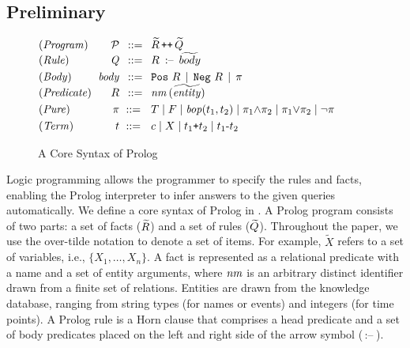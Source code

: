 \subsection{Preliminary}
\label{subsec3.1}

\begin{figure}[!b]
{
\vspace{-2mm}
\centering
\small
$
\arraycolsep=3pt\def\arraystretch{1}
\begin{array}{@{}lrcl}
\m{(Program)}&  \Prolog &{::=  } &
\widetilde{\relation} \,\plus\plus\,   \widetilde{\drule} 
\\
\m{(Rule)} &  \m{\drule} &{ ::=  } & 
\relation ~\hornarrow~ \widetilde{body}
\\[0.3em]
\m{(Body)} & \m{body} &{  ::=  } & 
{\tt{Pos}}~ \relation
\,\mid\, {\tt{Neg}}~ \relation 
\,\mid\, \pi
  \\
\m{(Predicate)} &  \relation &{  ::=  } &
 \m{\nm}\,(\widetilde{\entity}) 
\\[0.3em]
 \m{(Pure)}  &\pi &{::=}~&
{ T }
  \mid  F
 \mid  {\m{bop}(}{t_1, t_2}{)}
 \mid   {{\pi_1}}  {\wedge}  \pi_2
 \mid  {{\pi_1}} {\vee} \pi_2
 \mid  \neg\pi
\\[0.3em]
 \m{(Term)}  &t &{::=}~& c 
 \mid X 
 \mid t_1{\text{\ttfamily +}}t_2
 \mid t_1\text{-}t_2
\end{array}$
\caption{A Core Syntax of Prolog}
\label{fig:Syntax_of_Prolog}
}
\end{figure}

Logic programming allows the programmer to specify the rules and facts, enabling the Prolog interpreter to infer answers to the given queries automatically. 
We define a core syntax of Prolog in . 
A Prolog program consists of two parts: a set of facts ($\widetilde{R}$) and a set of rules ($\widetilde{Q}$). 
Throughout the paper, we use the over-tilde notation to denote a set of items. 
For example, $\widetilde{X}$ refers to a set of variables, i.e., $\{X_1, \dots, X_n\}$. 
A fact is represented as a relational predicate with a name and a set of entity arguments, where $\mathit{nm}$ is an arbitrary distinct identifier drawn from a finite set of relations. 
Entities are drawn from the knowledge database, ranging from string types (for names or events) and integers (for time points).  
A Prolog rule is a Horn clause that comprises a head predicate and a set of body predicates placed on the left and right side of the arrow symbol ($\,\text{:--}\,$).

